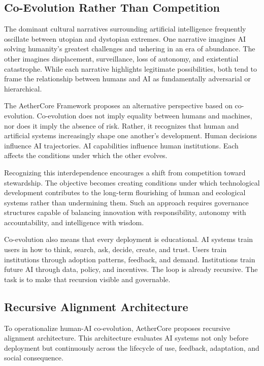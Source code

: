 \documentclass[12pt]{article}
\begin{document}
\subsection{Co-Evolution Rather Than Competition}

The dominant cultural narratives surrounding artificial intelligence frequently oscillate between utopian and dystopian extremes. One narrative imagines AI solving humanity's greatest challenges and ushering in an era of abundance. The other imagines displacement, surveillance, loss of autonomy, and existential catastrophe. While each narrative highlights legitimate possibilities, both tend to frame the relationship between humans and AI as fundamentally adversarial or hierarchical.

The AetherCore Framework proposes an alternative perspective based on co-evolution. Co-evolution does not imply equality between humans and machines, nor does it imply the absence of risk. Rather, it recognizes that human and artificial systems increasingly shape one another's development. Human decisions influence AI trajectories. AI capabilities influence human institutions. Each affects the conditions under which the other evolves.

Recognizing this interdependence encourages a shift from competition toward stewardship. The objective becomes creating conditions under which technological development contributes to the long-term flourishing of human and ecological systems rather than undermining them. Such an approach requires governance structures capable of balancing innovation with responsibility, autonomy with accountability, and intelligence with wisdom.

Co-evolution also means that every deployment is educational. AI systems train users in how to think, search, ask, decide, create, and trust. Users train institutions through adoption patterns, feedback, and demand. Institutions train future AI through data, policy, and incentives. The loop is already recursive. The task is to make that recursion visible and governable.

\subsection{Recursive Alignment Architecture}

To operationalize human-AI co-evolution, AetherCore proposes recursive alignment architecture. This architecture evaluates AI systems not only before deployment but continuously across the lifecycle of use, feedback, adaptation, and social consequence.
\end{document}
